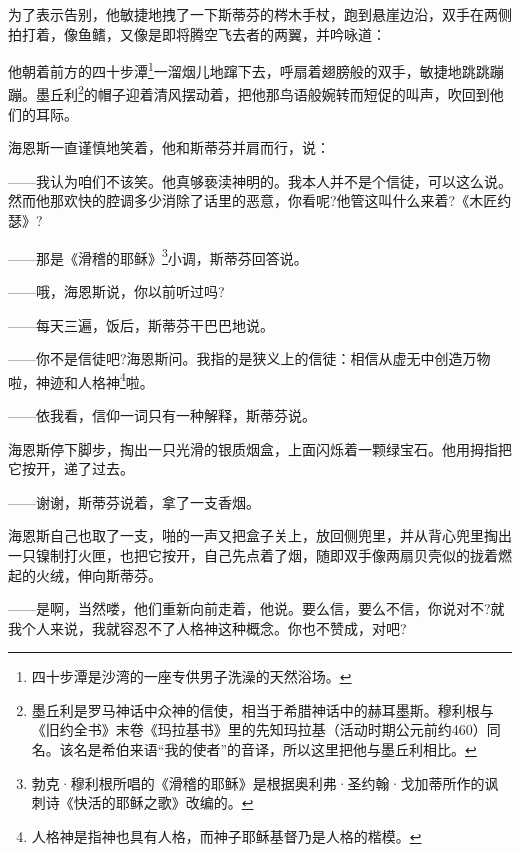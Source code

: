 \par 为了表示告别，他敏捷地拽了一下斯蒂芬的梣木手杖，跑到悬崖边沿，双手在两侧拍打着，像鱼鳍，又像是即将腾空飞去者的两翼，并吟咏道：
\par 他朝着前方的四十步潭\footnote{四十步潭是沙湾的一座专供男子洗澡的天然浴场。}一溜烟儿地蹿下去，呼扇着翅膀般的双手，敏捷地跳跳蹦蹦。墨丘利\footnote{墨丘利是罗马神话中众神的信使，相当于希腊神话中的赫耳墨斯。穆利根与《旧约全书》末卷《玛拉基书》里的先知玛拉基（活动时期公元前约460）同名。该名是希伯来语“我的使者”的音译，所以这里把他与墨丘利相比。}的帽子迎着清风摆动着，把他那鸟语般婉转而短促的叫声，吹回到他们的耳际。
\par 海恩斯一直谨慎地笑着，他和斯蒂芬并肩而行，说：
\par ——我认为咱们不该笑。他真够亵渎神明的。我本人并不是个信徒，可以这么说。然而他那欢快的腔调多少消除了话里的恶意，你看呢?他管这叫什么来着?《木匠约瑟》?
\par ——那是《滑稽的耶稣》\footnote{勃克·穆利根所唱的《滑稽的耶稣》是根据奥利弗·圣约翰·戈加蒂所作的讽刺诗《快活的耶稣之歌》改编的。}小调，斯蒂芬回答说。
\par ——哦，海恩斯说，你以前听过吗?
\par ——每天三遍，饭后，斯蒂芬干巴巴地说。
\par ——你不是信徒吧?海恩斯问。我指的是狭义上的信徒：相信从虚无中创造万物啦，神迹和人格神\footnote{人格神是指神也具有人格，而神子耶稣基督乃是人格的楷模。}啦。
\par ——依我看，信仰一词只有一种解释，斯蒂芬说。
\par 海恩斯停下脚步，掏出一只光滑的银质烟盒，上面闪烁着一颗绿宝石。他用拇指把它按开，递了过去。
\par ——谢谢，斯蒂芬说着，拿了一支香烟。
\par 海恩斯自己也取了一支，啪的一声又把盒子关上，放回侧兜里，并从背心兜里掏出一只镍制打火匣，也把它按开，自己先点着了烟，随即双手像两扇贝壳似的拢着燃起的火绒，伸向斯蒂芬。
\par ——是啊，当然喽，他们重新向前走着，他说。要么信，要么不信，你说对不?就我个人来说，我就容忍不了人格神这种概念。你也不赞成，对吧?
